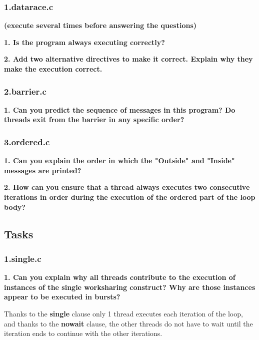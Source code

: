 \documentclass[12pt, a4paper]{article}
\begin{document}
\subsubsection{1.datarace.c}

\textbf{(execute several times before answering the questions)}

\hfill

\textbf{1. Is the program always executing correctly?}

\hfill

\textbf{2. Add two alternative directives to make it correct. Explain why they make the execution
correct.}

\subsubsection{2.barrier.c}

\textbf{1. Can you predict the sequence of messages in this program? Do threads exit from the barrier
in any specific order?}

\subsubsection{3.ordered.c}

\textbf{1. Can you explain the order in which the "Outside" and "Inside" messages are printed?}

\hfill

\textbf{2. How can you ensure that a thread always executes two consecutive iterations in order during
the execution of the ordered part of the loop body?}

\subsection{Tasks}

\subsubsection{1.single.c}

\textbf{1. Can you explain why all threads contribute to the execution of instances of the single worksharing construct? Why are those instances appear to be executed in bursts?}

Thanks to the \textbf{single} clause only 1 thread executes each iteration of the loop, and thanks to the \textbf{nowait} clause, the other threads do not have to wait until the iteration ends to continue with the other iterations.
\end{document}
